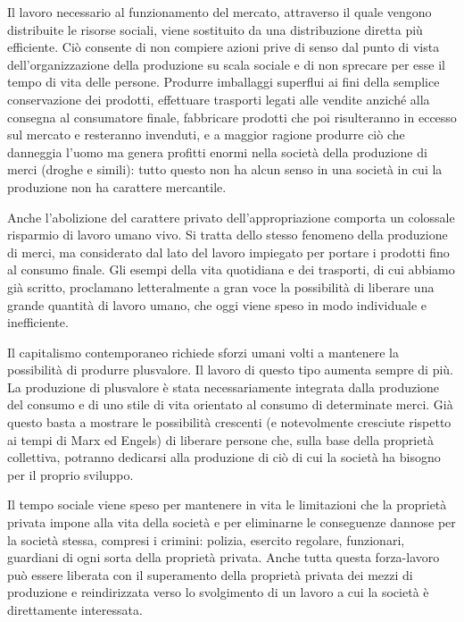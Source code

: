 \documentclass[12pt,a4paper,openany]{book}
\begin{document}
Il lavoro necessario al funzionamento del mercato, attraverso il quale vengono distribuite le risorse sociali, viene sostituito da una distribuzione diretta più efficiente. Ciò consente di non compiere azioni prive di senso dal punto di vista dell'organizzazione della produzione su scala sociale e di non sprecare per esse il tempo di vita delle persone. Produrre imballaggi superflui ai fini della semplice conservazione dei prodotti, effettuare trasporti legati alle vendite anziché alla consegna al consumatore finale, fabbricare prodotti che poi risulteranno in eccesso sul mercato e resteranno invenduti, e a maggior ragione produrre ciò che danneggia l'uomo ma genera profitti enormi nella società della produzione di merci (droghe e simili): tutto questo non ha alcun senso in una società in cui la produzione non ha carattere mercantile.

Anche l'abolizione del carattere privato dell'appropriazione comporta un colossale risparmio di lavoro umano vivo. Si tratta dello stesso fenomeno della produzione di merci, ma considerato dal lato del lavoro impiegato per portare i prodotti fino al consumo finale. Gli esempi della vita quotidiana e dei trasporti, di cui abbiamo già scritto, proclamano letteralmente a gran voce la possibilità di liberare una grande quantità di lavoro umano, che oggi viene speso in modo individuale e inefficiente.

Il capitalismo contemporaneo richiede sforzi umani volti a mantenere la possibilità di produrre plusvalore. Il lavoro di questo tipo aumenta sempre di più. La produzione di plusvalore è stata necessariamente integrata dalla produzione del consumo e di uno stile di vita orientato al consumo di determinate merci. Già questo basta a mostrare le possibilità crescenti (e notevolmente cresciute rispetto ai tempi di Marx ed Engels) di liberare persone che, sulla base della proprietà collettiva, potranno dedicarsi alla produzione di ciò di cui la società ha bisogno per il proprio sviluppo.

Il tempo sociale viene speso per mantenere in vita le limitazioni che la proprietà privata impone alla vita della società e per eliminarne le conseguenze dannose per la società stessa, compresi i crimini: polizia, esercito regolare, funzionari, guardiani di ogni sorta della proprietà privata. Anche tutta questa forza-lavoro può essere liberata con il superamento della proprietà privata dei mezzi di produzione e reindirizzata verso lo svolgimento di un lavoro a cui la società è direttamente interessata.
\end{document}
